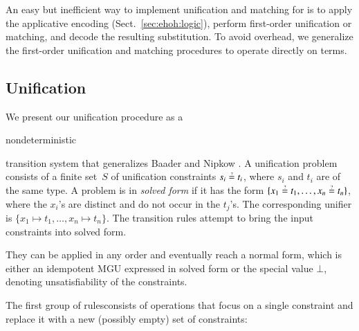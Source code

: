 An easy but inefficient way to implement unification and matching for \lfhol{}
is to apply the applicative encoding (Sect.~\ref{sec:ehoh:logic}), perform
first-order unification or matching, and decode the resulting
substitution. To avoid overhead, we generalize the first-order unification
and matching procedures to operate directly on \lfhol{} terms.

\subsection{Unification}
We present our unification procedure as a \begin{rep}nondeterministic \end{rep}transition system
that generalizes Baader and Nipkow \cite{bn-98-tr-and-all-that}.
A unification problem consists of a finite set~$\mathit{S}$ of unification constraints $s_i
\unif t_i$, where $s_i$ and $t_i$ are of the same type.
A problem is in \emph{solved form} if it has the form $\{ x_1 \unif t_1,\allowbreak
\ldots, x_n \unif t_n \}$, where the $x_i$'s are distinct and do not occur in
the $t_j$'s. The corresponding unifier is
$\{ x_1 \mapsto t_1,\allowbreak \ldots, x_n \mapsto t_n \}.$
%
The transition rules attempt to bring the input constraints into solved form.
\begin{rep}They can be applied in any order and eventually reach a normal form, which is
either an idempotent MGU expressed in solved form or the special
value $\bot$, denoting unsatisfiability of the constraints.\end{rep}

The first group of rulesconsists
of operations that focus on a single constraint and replace it with a new
(possibly empty) set of constraints:

